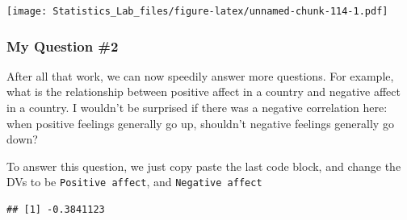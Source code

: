 \documentclass[
]{book}
\newenvironment{Shaded}{\begin{snugshade}}{\end{snugshade}}
\newcommand{\AttributeTok}[1]{\textcolor[rgb]{0.77,0.63,0.00}{#1}}
\newcommand{\CommentTok}[1]{\textcolor[rgb]{0.56,0.35,0.01}{\textit{#1}}}
\newcommand{\FunctionTok}[1]{\textcolor[rgb]{0.00,0.00,0.00}{#1}}
\newcommand{\NormalTok}[1]{#1}
\newcommand{\OtherTok}[1]{\textcolor[rgb]{0.56,0.35,0.01}{#1}}
\newcommand{\SpecialCharTok}[1]{\textcolor[rgb]{0.00,0.00,0.00}{#1}}
\newcommand{\StringTok}[1]{\textcolor[rgb]{0.31,0.60,0.02}{#1}}
\begin{document}
\texttt{[image: Statistics\_Lab\_files/figure-latex/unnamed-chunk-114-1.pdf]}

\hypertarget{my-question-2}{%
\subsubsection{My Question \#2}\label{my-question-2}}

After all that work, we can now speedily answer more questions. For example, what is the relationship between positive affect in a country and negative affect in a country. I wouldn't be surprised if there was a negative correlation here: when positive feelings generally go up, shouldn't negative feelings generally go down?

To answer this question, we just copy paste the last code block, and change the DVs to be \texttt{Positive\ affect}, and \texttt{Negative\ affect}

\begin{Shaded}
\end{Shaded}

\begin{verbatim}
## [1] -0.3841123
\end{verbatim}
\end{document}

